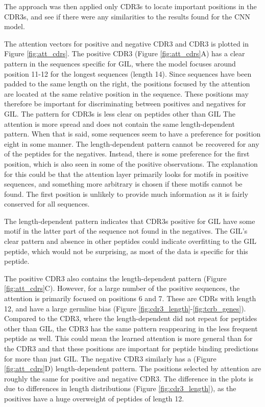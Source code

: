 The approach was then applied only CDR3s to locate important positions in the CDR3s, and see if there were any similarities to the results found for the CNN model.

The attention vectors for positive and negative CDR3{\textalpha} and CDR3{\textbeta} is plotted in Figure \ref{fig:att_cdrs}. The positive CDR3{\textalpha} (Figure \ref{fig:att_cdrs}A) has a clear pattern in the sequences specific for GIL, where the model focuses around position 11-12 for the longest sequences (length 14). Since sequences have been padded to the same length on the right, the positions focused by the attention are located at the same relative position in the sequence. These positions may therefore be important for discriminating between positives and negatives for GIL. The pattern for CDR3{\textalpha}s is less clear on peptides other than GIL The attention is more spread and does not contain the same length-dependent pattern. When that is said, some sequences seem to have a preference for position eight in some manner. The length-dependent pattern cannot be recovered for any of the peptides for the negatives. Instead, there is some preference for the first position, which is also seen in some of the positive observations. The explanation for this could be that the attention layer primarily looks for motifs in positive sequences, and something more arbitrary is chosen if these motifs cannot be found. The first position is unlikely to provide much information as it is fairly conserved for all sequences. 

The length-dependent pattern indicates that CDR3{\textalpha}s positive for GIL have some motif in the latter part of the sequence not found in the negatives. The GIL's clear pattern and absence in other peptides could indicate overfitting to the GIL peptide, which would not be surprising, as most of the data is specific for this peptide.

The positive CDR3{\textbeta} also contains the length-dependent pattern (Figure \ref{fig:att_cdrs}C). However, for a large number of the positive sequences, the attention is primarily focused on positions 6 and 7. These are CDRs with length 12, and have a large germline bias (Figure \ref{fig:cdr3_length}-\ref{fig:tcrb_genes}). Compared to the CDR3{\textalpha}, where the length-dependent did not repeat for peptides other than GIL, the CDR3{\textbeta} has the same pattern reappearing in the less frequent peptide as well. This could mean the learned attention is more general than for the CDR3{\textalpha} and that these positions are important for peptide binding predictions for more than just GIL. The negative CDR3{\textbeta} similarly has a (Figure \ref{fig:att_cdrs}D) length-dependent pattern. The positions selected by attention are roughly the same for positive and negative CDR3{\textbeta}. The difference in the plots is due to differences in length distributions (Figure \ref{fig:cdr3_length}), as the positives have a huge overweight of peptides of length 12.

